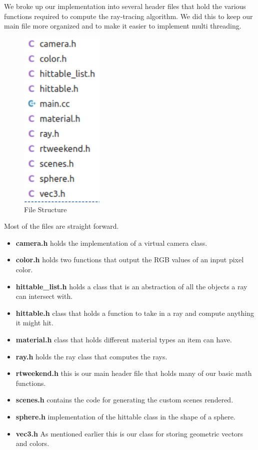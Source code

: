 \documentclass[conference]{IEEEtran}
\begin{document}
We broke up our implementation into several header files that hold the various functions required to compute the ray-tracing algorithm. We did this to keep our main file more organized and to make it easier to implement multi threading.
\begin{figure}[H]
\includegraphics[width=4cm]{images/fileStructure.png}\\
File Structure
\centering
\end{figure}
Most of the files are straight forward. 
\begin{itemize}
    \item \textbf{camera.h} holds the implementation of a virtual camera class.
    \item  \textbf{color.h} holds two functions that output the RGB values of an input pixel color.
    \item  \textbf{hittable\_list.h} holds a class that is an abstraction of all the objects a ray can intersect with.
    \item  \textbf{hittable.h} class that holds a function to take in a ray and compute anything it might hit.
    \item  \textbf{material.h} class that holds different material types an item can have.
    \item  \textbf{ray.h} holds the ray class that computes the rays.
    \item  \textbf{rtweekend.h} this is our main header file that holds many of our basic math functions.
    \item  \textbf{scenes.h} contains the code for generating the custom scenes rendered.
    \item  \textbf{sphere.h} implementation of the hittable class in the shape of a sphere.
    \item  \textbf{vec3.h} As mentioned earlier this is our class for storing geometric vectors and colors.
\end{itemize}
\end{document}
